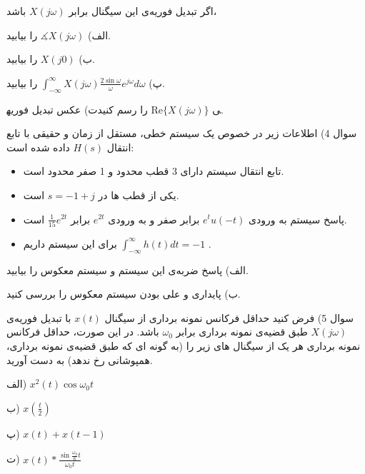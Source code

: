 \documentclass{article}
\begin{document}
اگر تبدیل فوریه‌ی این سیگنال برابر 
$
X(j\omega)
$
باشد،

الف) 
$
\measuredangle X(j\omega)
$
را بیابید.

ب)
$
X(j0)
$
را بیابید.

پ)
$
\int_{-\infty}^{\infty}X(j\omega)\frac{2\sin\omega}{\omega}e^{j\omega}d\omega
$
را بیابید.

ت) عکس تبدیل فوریه‎ی
$
\mathrm{Re}\{X(j\omega)\}
$
را رسم کنید.

\newpage

سوال 4) اطلاعات زیر در خصوص یک سیستم خطی، مستقل از زمان و حقیقی با تابع انتقال 
$
H(s)
$
داده شده است:

\begin{itemize}
\item
تابع انتقال سیستم دارای 3 قطب محدود و 1 صفر محدود است.
\item
یکی از قطب ها در 
$
s=-1+j
$
است.
\item
پاسخ سیستم به ورودی 
$
e^tu(-t)
$
برابر صفر و به ورودی
$
e^{2t}
$
برابر
$
\frac{1}{15}e^{2t}
$
است.
\item
برای این سیستم داریم
$
\int_{-\infty}^{\infty}h(t)dt=-1
$
.
\end{itemize}

الف) پاسخ ضربه‌ی این سیستم و سیستم معکوس را بیابید.

ب) پایداری و علی بودن سیستم معکوس را بررسی کنید.

\newpage

سوال 5)  فرض کنید حداقل فرکانس نمونه برداری از سیگنال 
$
x(t)
$
با تبدیل فوریه‌ی 
$
X(j\omega)
$
طبق قضیه‌ی نمونه برداری برابر
$
\omega_0
$
باشد. در این صورت، حداقل فرکانس نمونه برداری هر یک از سیگنال های زیر را (به گونه ای که طبق قضیه‌ی نمونه برداری، همپوشانی رخ ندهد) به دست آورید.

الف) 
$
x^2(t)\cos\omega_0 t
$

ب)
$
x(\frac{t}{2})
$

پ)
$
x(t)+x(t-1)
$

ت)
$
x(t)*\frac{\sin \frac{\omega_0}{6}t}{\omega_0t}
$
\end{document}
